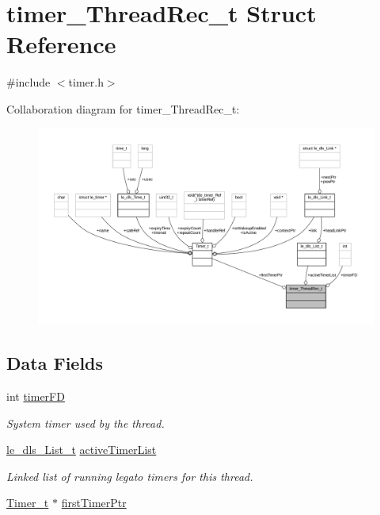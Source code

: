 \hypertarget{structtimer___thread_rec__t}{}\section{timer\+\_\+\+Thread\+Rec\+\_\+t Struct Reference}
\label{structtimer___thread_rec__t}


{\ttfamily \#include $<$timer.\+h$>$}



Collaboration diagram for timer\+\_\+\+Thread\+Rec\+\_\+t\+:
\nopagebreak
\begin{figure}[H]
\begin{center}
\leavevmode
\includegraphics[width=350pt]{structtimer___thread_rec__t__coll__graph}
\end{center}
\end{figure}
\subsection*{Data Fields}
\begin{DoxyCompactItemize}
\item 
int \hyperlink{structtimer___thread_rec__t_a36125958610bb1854a7a4d215a5fa502}{timer\+FD}
\begin{DoxyCompactList}\small\item\em System timer used by the thread. \end{DoxyCompactList}\item 
\hyperlink{structle__dls___list__t}{le\+\_\+dls\+\_\+\+List\+\_\+t} \hyperlink{structtimer___thread_rec__t_a56eaf97d404201953bc35a15739d5429}{active\+Timer\+List}
\begin{DoxyCompactList}\small\item\em Linked list of running legato timers for this thread. \end{DoxyCompactList}\item 
\hyperlink{struct_timer__t}{Timer\+\_\+t} $\ast$ \hyperlink{structtimer___thread_rec__t_ae2c2d0c270c81c9faa903c1adf8407ce}{first\+Timer\+Ptr}
\end{DoxyCompactItemize}


